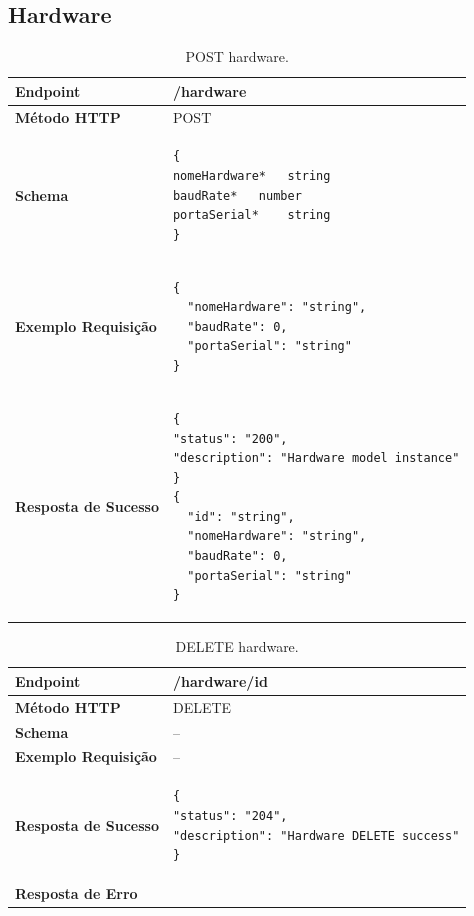 \begin{apendicesenv}
\section{Hardware}
\begin{table}[H]
\begin{tabular}{|l|l|}
\hline
\textbf{Endpoint}            & /hardware \\ \hline
\textbf{Método HTTP}         & POST \\ \hline
\textbf{Schema}              & 
\begin{lstlisting}
{
nomeHardware*	string
baudRate*	number
portaSerial*	string
}
\end{lstlisting}
\\ \hline
\textbf{Exemplo Requisição}  &  
\begin{lstlisting}
{
  "nomeHardware": "string",
  "baudRate": 0,
  "portaSerial": "string"
}
\end{lstlisting}
\\ \hline
\textbf{Resposta de Sucesso} & 
\begin{lstlisting}
{
"status": "200",
"description": "Hardware model instance"
}
{
  "id": "string",
  "nomeHardware": "string",
  "baudRate": 0,
  "portaSerial": "string"
}
\end{lstlisting}
\\ \hline
\end{tabular}
\caption{POST hardware.}
\label{post_hardware}
\end{table}
\begin{table}[H]
\begin{tabular}{|l|l|}
\hline
\textbf{Endpoint}            & /hardware/{id} \\ \hline
\textbf{Método HTTP}         & DELETE \\ \hline
\textbf{Schema}              &  -- \\ \hline
\textbf{Exemplo Requisição}  &  -- \\ \hline
\textbf{Resposta de Sucesso} &
\begin{lstlisting}
{
"status": "204",
"description": "Hardware DELETE success"
}
\end{lstlisting}
\\ \hline
\textbf{Resposta de Erro}    &  \\ \hline
\end{tabular}
\caption{DELETE hardware.}
\label{delete_hardware}
\end{table}

\end{apendicesenv}
